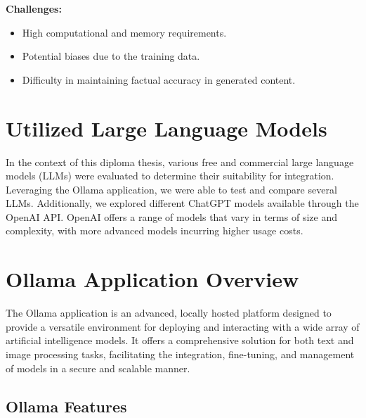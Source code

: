 \textbf{Challenges:}
\begin{itemize}
\item High computational and memory requirements.
\item Potential biases due to the training data.
\item Difficulty in maintaining factual accuracy in generated content.
\end{itemize}

\cite{what-are-LLMs-IBM}

\section{Utilized Large Language Models}

In the context of this diploma thesis, various free and commercial large language models (LLMs) 
were evaluated to determine their suitability for integration. Leveraging the Ollama application, 
we were able to test and compare several LLMs. Additionally, we explored different ChatGPT models available through the OpenAI API.
OpenAI offers a range of models that vary in terms of size and complexity, with more advanced models incurring higher usage costs.

\cite{OpenAI_API_overview}
\cite{WhatisOllama}


\section{Ollama Application Overview}

The Ollama application is an advanced, locally hosted platform designed to provide a versatile environment for deploying and interacting with a wide array of artificial intelligence models. It offers a comprehensive solution for both text and image processing tasks, facilitating the integration, fine-tuning, and management of models in a secure and scalable manner.

\subsection{Ollama Features}

